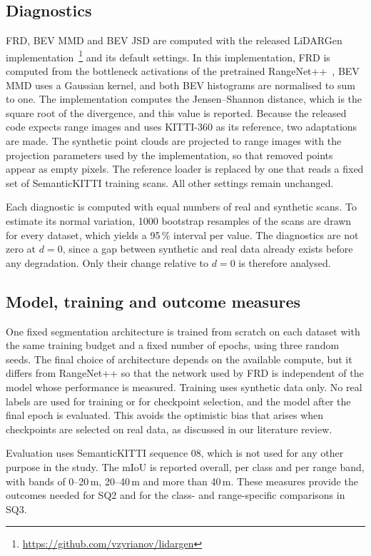 \subsection{Diagnostics}\label{sec:diagnostics}
FRD, BEV MMD and BEV JSD are computed with the released LiDARGen implementation~\cite{zyrianovLearningGenerateRealistic2022}\footnote{\url{https://github.com/vzyrianov/lidargen}} and its default settings. In this implementation, FRD is computed from the bottleneck activations of the pretrained RangeNet++~\cite{miliotoRangeNet++Fast2019a}, BEV MMD uses a Gaussian kernel, and both BEV histograms are normalised to sum to one. The implementation computes the Jensen--Shannon distance, which is the square root of the divergence, and this value is reported. Because the released code expects range images and uses KITTI-360 as its reference, two adaptations are made. The synthetic point clouds are projected to range images with the projection parameters used by the implementation, so that removed points appear as empty pixels. The reference loader is replaced by one that reads a fixed set of SemanticKITTI training scans. All other settings remain unchanged.

Each diagnostic is computed with equal numbers of real and synthetic scans. To estimate its normal variation, 1000 bootstrap resamples of the scans are drawn for every dataset, which yields a 95\,\% interval per value. The diagnostics are not zero at $d=0$, since a gap between synthetic and real data already exists before any degradation. Only their change relative to $d=0$ is therefore analysed.

\subsection{Model, training and outcome measures}\label{sec:model}
One fixed segmentation architecture is trained from scratch on each dataset with the same training budget and a fixed number of epochs, using three random seeds. The final choice of architecture depends on the available compute, but it differs from RangeNet++ so that the network used by FRD is independent of the model whose performance is measured. Training uses synthetic data only. No real labels are used for training or for checkpoint selection, and the model after the final epoch is evaluated. This avoids the optimistic bias that arises when checkpoints are selected on real data, as discussed in our literature review.

Evaluation uses SemanticKITTI sequence 08, which is not used for any other purpose in the study. The mIoU is reported overall, per class and per range band, with bands of 0--20\,m, 20--40\,m and more than 40\,m. These measures provide the outcomes needed for SQ2 and for the class- and range-specific comparisons in SQ3.

